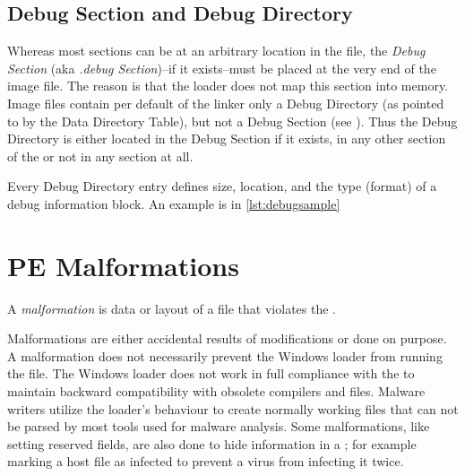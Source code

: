\subsection*{Debug Section and Debug Directory}

Whereas most sections can be at an arbitrary location in the file, the \emph{Debug Section} (aka \emph{.debug Section})--if it exists--must be placed at the very end of the image file. The reason is that the loader does not map this section into memory. Image files contain per default of the linker only a Debug Directory (as pointed to by the Data Directory Table), but not a Debug Section (see \cite[]{pespec}). Thus the Debug Directory is either located in the Debug Section if it exists, in any other section of the \PE{} or not in any section at all.

Every Debug Directory entry defines \ia{} size, location, and the type (format) of a debug information block. An example is in \autoref{lst:debugsample}




\section{PE Malformations} \label{sec:malformations}

\begin{definition}[Malformation]
A \emph{malformation} is data or layout of a \PE{} file that violates the \PECOFF{}.
\end{definition} 

Malformations are either accidental results of \PE{} modifications or done on purpose.
A malformation does not necessarily prevent the Windows loader from running the file. The Windows loader does not work in full compliance with the \PECOFF{} to maintain backward compatibility with obsolete compilers and files. Malware writers utilize the loader's behaviour to create normally working \PE{} files that can not be parsed by most tools used for malware analysis. Some malformations, like setting reserved fields, are also done to hide information in a \PE{}; for example marking a host file as infected to prevent a virus from infecting it twice.

